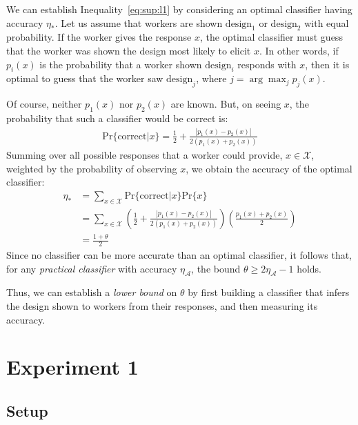 \documentclass{sigchi}
\begin{document}
We can establish Inequality~\ref{eq:sup:l1} by considering an
optimal classifier having accuracy $\eta_*$.  
Let us assume that workers are shown 
$\mathrm{design}_1$ or $\mathrm{design}_2$ with equal probability.
If the worker gives the response $x$, the optimal classifier must guess
that the worker was shown the design most likely to elicit $x$.
In other words, if $p_i(x)$ is the probability that a worker shown 
$\mathrm{design}_i$ responds with $x$, then it is optimal to 
guess that the worker saw $\mathrm{design}_j$, where 
$j = \arg\max_j{p_j(x)}$.

Of course, neither $p_1(x)$ nor $p_2(x)$ are known.  But, on seeing $x$,
the probability that such a classifier would be correct is:
\begin{align}
  \mathrm{Pr}\{\mathrm{correct}|x\} = \frac{1}{2} 
	+ \frac{|p_1(x) - p_2(x)|}{2(p_1(x) + p_2(x))}
\end{align}
Summing over all possible responses that a worker could provide, 
$x \in \mathcal{X}$, weighted by the probability of observing $x$, 
we obtain the accuracy of the optimal classifier:
\begin{align}
\eta_* 
  &= \sum_{x\in\mathcal{X}} 
	\mathrm{Pr}\{\mathrm{correct}|x\}\mathrm{Pr}\{x\} \\
  &= \sum_{x\in\mathcal{X}} 
	\left(
	\frac{1}{2} + \frac{|p_1(x) - p_2(x)|}{2(p_1(x) + p_2(x))}
  \right) \left( 
	\frac{p_1(x) + p_2(x)}{2} 
  \right) \\
  &= \frac{1 + \theta}{2}
\end{align}
Since no classifier can be more accurate than an optimal classifier,
it follows that, for any \textit{practical classifier} 
with accuracy $\eta_\mathcal{A}$, the bound 
$\theta \geq 2\eta_\mathcal{A} -1$ holds.

Thus, we can establish a \textit{lower bound} on $\theta$ by first 
building a classifier that infers the design shown to workers from their 
responses, and then measuring its accuracy.

\section{Experiment 1}
\subsection{Setup}
\end{document}
